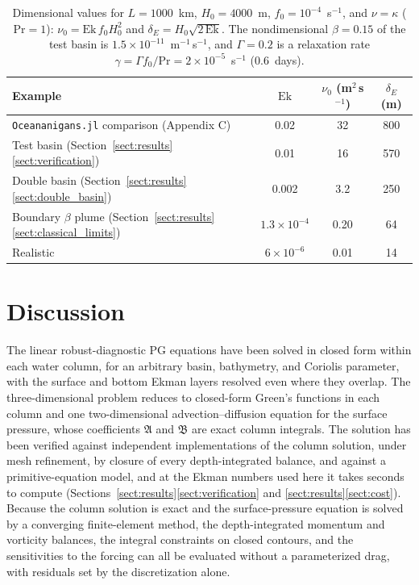 \documentclass{ametsocV6.2}
\begin{document}
\begin{table}
\centering
\begin{tabular}{lccc}
\hline
Example & $\mathrm{Ek}$ & $\nu_0$ (m$^2$\,s$^{-1}$) & $\delta_E$ (m) \\
\hline
\texttt{Oceananigans.jl} comparison (Appendix C) & 0.02 & 32 & 800 \\
Test basin (Section~\ref{sect:results}\ref{sect:verification}) & 0.01 & 16 & 570 \\
Double basin (Section~\ref{sect:results}\ref{sect:double_basin}) & 0.002 & 3.2 & 250 \\
Boundary $\beta$ plume (Section~\ref{sect:results}\ref{sect:classical_limits}) & $1.3 \times 10^{-4}$ & 0.20 & 64 \\
Realistic & $6 \times 10^{-6}$ & 0.01 & 14 \\
\hline
\end{tabular}
\vspace{6pt}
\caption{\label{tab:dimensional} Dimensional values for $L = 1000$~km, $H_0 = 4000$~m, $f_0 = 10^{-4}$~s$^{-1}$, and $\nu = \kappa$ ($\mathrm{Pr} = 1$): $\nu_0 = \mathrm{Ek}\, f_0 H_0^2$ and $\delta_E = H_0 \sqrt{2\,\mathrm{Ek}}$.
The nondimensional $\beta = 0.15$ of the test basin is $1.5 \times 10^{-11}$~m$^{-1}$\,s$^{-1}$, and $\Gamma = 0.2$ is a relaxation rate $\gamma = \Gamma f_0/\mathrm{Pr} = 2 \times 10^{-5}$~s$^{-1}$ (0.6~days).}
\end{table}

\section{Discussion}
\label{sect:discussion}

The linear robust-diagnostic PG equations have been solved in closed form within each water column, for an arbitrary basin, bathymetry, and Coriolis parameter, with the surface and bottom Ekman layers resolved even where they overlap.
The three-dimensional problem reduces to closed-form Green's functions in each column and one two-dimensional advection--diffusion equation for the surface pressure, whose coefficients $\mathfrak{A}$ and $\mathfrak{B}$ are exact column integrals.
The solution has been verified against independent implementations of the column solution, under mesh refinement, by closure of every depth-integrated balance, and against a primitive-equation model, and at the Ekman numbers used here it takes seconds to compute (Sections~\ref{sect:results}\ref{sect:verification} and \ref{sect:results}\ref{sect:cost}).
Because the column solution is exact and the surface-pressure equation is solved by a converging finite-element method, the depth-integrated momentum and vorticity balances, the integral constraints on closed contours, and the sensitivities to the forcing can all be evaluated without a parameterized drag, with residuals set by the discretization alone.
\end{document}
